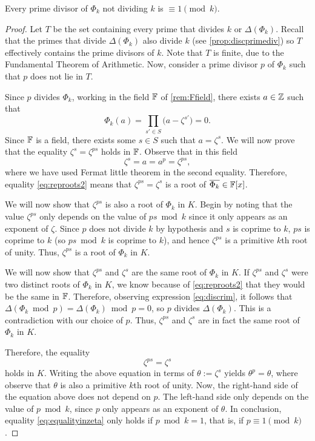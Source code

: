 \documentclass[../main.tex]{subfiles}
\begin{document}
\begin{proposition}\label{prop:fdivisors_l_cong1}
	Every prime divisor of $\Phi_k$ not dividing $k$ is $\equiv 1 \pmod{k}$. 
\end{proposition}
\begin{proof}
	Let $T$ be the set containing every prime that divides $k$ or $\Delta(\Phi_k)$. Recall that the primes that divide $\Delta(\Phi_k)$ also divide $k$ (see \cref{prop:discprimediv}) so $T$ effectively contains the prime divisors of $k$. Note that $T$ is finite, due to the Fundamental Theorem of Arithmetic. Now, consider a prime divisor $p$ of $\Phi_k$ such that $p$ does not lie in $T$.
	
	Since $p$ divides $\Phi_k$, working in the field $\mathbb{F}$ of \cref{rem:Ffield}, there exists $a\in\mathbb{Z}$ such that 
	\begin{equation*}
		\Phi_k(a)=\prod_{s'\in S}\big(a-\zeta^{s'}\big)=0.
	\end{equation*}
	Since $\mathbb{F}$ is a field, there exists some $s\in S$ such that $a=\zeta^{s}$. We will now prove that the equality $\zeta^s=\zeta^{ps}$ holds in $\mathbb{F}$. Observe that in this field
	\begin{equation}\label{eq:reproots2}
		\zeta^{s}=a=a^p=\zeta^{ps},
	\end{equation}
	where we have used Fermat little theorem in the second equality. Therefore, equality \cref{eq:reproots2} means that $\zeta^{ps}=\zeta^{s}$ is a root of $\overline{\Phi_k}\in\mathbb{F}[x]$. 
	
	We will now show that $\zeta^{ps}$ is also a root of $\Phi_k$ in $K$. Begin by noting that the value $\zeta^{ps}$ only depends on the value of $ps \bmod{k}$ since it only appears as an exponent of $\zeta$. Since $p$ does not divide $k$ by hypothesis and $s$ is coprime to $k$, $ps$ is coprime to $k$ (so $ps \bmod{k}$ is coprime to $k$), and hence $\zeta^{ps}$ is a primitive $k$th root of unity. Thus, $\zeta^{ps}$ is a root of $\Phi_k$ in $K$.
	
	We will now show that $\zeta^{ps}$ and $\zeta^{s}$ are the same root of $\Phi_k$ in $K$. If $\zeta^{ps}$ and $\zeta^{s}$ were two distinct roots of $\Phi_k$ in $K$, we know because of \cref{eq:reproots2} that they would be the same in $\mathbb{F}$. Therefore, observing expression \cref{eq:discrim}, it follows that $\Delta(\Phi_k \bmod{p})=\Delta(\Phi_k) \bmod{p}=0$, so $p$ divides $\Delta(\Phi_k)$. This is a contradiction with our choice of $p$. Thus, $\zeta^{ps}$ and $\zeta^{s}$ are in fact the same root of $\Phi_k$ in $K$.
	
	Therefore, the equality
	\begin{equation}\label{eq:equalityinzeta}
		\zeta^{ps}=\zeta^{s}
	\end{equation}
	holds in $K$. Writing the above equation in terms of $\theta:=\zeta^{s}$ yields $\theta^{p}=\theta$, where observe that $\theta$ is also a primitive $k$th root of unity. Now, the right-hand side of the equation above does not depend on $p$. The left-hand side only depends on the value of $p\bmod{k}$, since $p$ only appears as an exponent of $\theta$. In conclusion, equality \cref{eq:equalityinzeta} only holds if $p \bmod{k}=1$, that is, if $p\equiv 1\pmod{k}$.
\end{proof}
\end{document}
